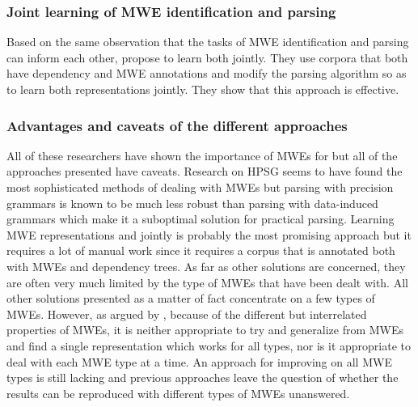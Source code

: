 \documentclass[output=paper]{langsci/langscibook}
\begin{document}
                        \subsubsection{Joint learning of MWE identification and parsing}
                        \indent Based on the same observation that the tasks of MWE identification and parsing can inform each other, \citet{constantnivre16} propose to learn both jointly. They use corpora that both have dependency and MWE annotations and modify the parsing algorithm so as to learn both representations jointly. They show that this approach is effective. 

                        \subsubsection{Advantages and caveats of the different approaches}
                        \indent All of these researchers have shown the importance of MWEs for  but all of the approaches presented have caveats. Research on HPSG seems to have found the most sophisticated methods of dealing with MWEs but parsing with precision grammars is known to be much less robust \citep{zhang08robustparsing} than parsing with data-induced grammars which make it a suboptimal solution for practical parsing. Learning MWE representations and  jointly is probably the most promising approach but it requires a lot of manual work since it requires a corpus that is annotated both with MWEs and dependency trees. As far as other solutions are concerned, they are often very much limited by the type of MWEs that have been dealt with. All other solutions presented as a matter of fact concentrate on a few types of MWEs. However, as argued by \citet{kim2008}, because of the different but interrelated properties of MWEs, it is neither appropriate to try and generalize from MWEs and find a single representation which works for all types, nor is it appropriate to deal with each MWE type at a time. An approach for improving  on all MWE types is still lacking and previous approaches leave the question of whether the results can be reproduced with different types of MWEs unanswered. 
\end{document}
